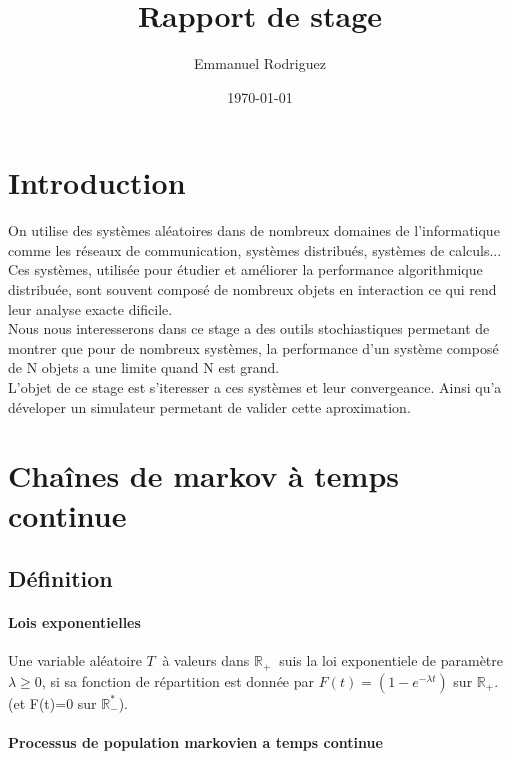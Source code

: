 \documentclass[a4paper]{article}
\date{\today}
\title{Rapport de stage}
\author{Emmanuel Rodriguez}
\begin{document}
\lstset{language=Python} 

\maketitle

\section{Introduction}

On utilise des systèmes aléatoires dans de nombreux domaines de
l'informatique comme les réseaux de communication, systèmes
distribués, systèmes de calculs... Ces systèmes, utilisée pour étudier
et améliorer la performance algorithmique distribuée, sont souvent
composé de nombreux objets en interaction ce qui rend leur analyse
exacte dificile. \\
\smallbreak
Nous nous interesserons dans ce stage a des outils
stochiastiques permetant de montrer que pour de nombreux systèmes, la
performance d'un système composé de N objets a une limite quand N est grand. \\
L'objet de ce stage est s'iteresser a ces systèmes et leur
convergeance. Ainsi qu'a déveloper un simulateur permetant de valider
cette aproximation.

\section{Chaînes de markov à temps continue}

\cite{courscmtc}

\subsection{Définition}

\paragraph{Lois exponentielles}
Une variable aléatoire $T \ $ à valeurs dans $\mathbb{R}_+ \ $ suis la
loi exponentiele de paramètre $\lambda \geq 0$, si  sa fonction de
répartition est donnée par $F(t)=(1-e^{-\lambda t})$ sur
$\mathbb{R}_+$. (et F(t)=0 sur $\mathbb{R}_-^*$).

\paragraph{Processus de population markovien a temps continue}
\end{document}
